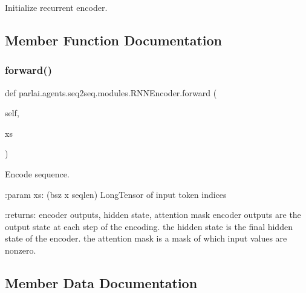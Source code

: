 \begin{DoxyVerb}Initialize recurrent encoder.
\end{DoxyVerb}
 

\subsection{Member Function Documentation}
\mbox{\label{classparlai_1_1agents_1_1seq2seq_1_1modules_1_1RNNEncoder_a4ae3d043b7a381e0eb89eb5460217029}} 
\subsubsection{\texorpdfstring{forward()}{forward()}}
{\footnotesize\ttfamily def parlai.\+agents.\+seq2seq.\+modules.\+R\+N\+N\+Encoder.\+forward (\begin{DoxyParamCaption}\item[{}]{self,  }\item[{}]{xs }\end{DoxyParamCaption})}

\begin{DoxyVerb}Encode sequence.

:param xs: (bsz x seqlen) LongTensor of input token indices

:returns: encoder outputs, hidden state, attention mask
    encoder outputs are the output state at each step of the encoding.
    the hidden state is the final hidden state of the encoder.
    the attention mask is a mask of which input values are nonzero.
\end{DoxyVerb}
 

\subsection{Member Data Documentation}
\mbox{\label{classparlai_1_1agents_1_1seq2seq_1_1modules_1_1RNNEncoder_ab5195ce2a874d7d793c5e68e77594deb}} 
